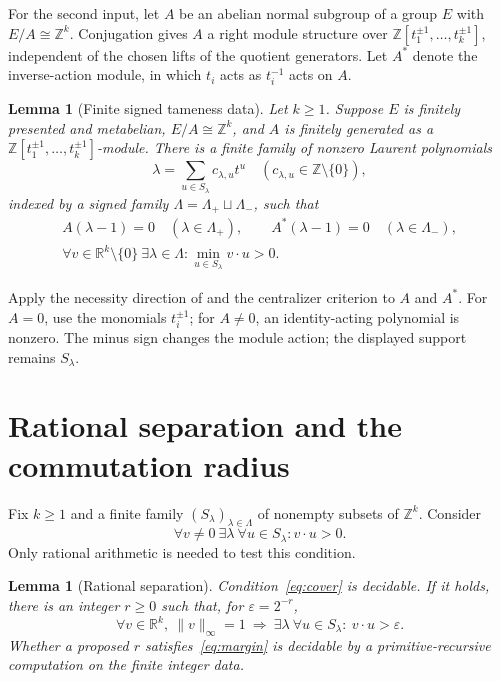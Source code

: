 \documentclass[12pt]{article}
\numberwithin{equation}{section}
\newtheorem{lemma}[theorem]{Lemma}
\theoremstyle{definition}
\theoremstyle{remark}
\newcommand{\Z}{\mathbb Z}
\newcommand{\R}{\mathbb R}
\newcommand{\norm}[1]{\lVert #1\rVert}
\newcommand{\laur}{\Z[t_1^{\pm1},\ldots,t_k^{\pm1}]}
\begin{document}
For the second input, let $A$ be an abelian normal subgroup of a group
$E$ with $E/A\cong\Z^k$. Conjugation gives $A$ a right module structure
over $\laur$, independent of the chosen lifts of the quotient generators.
Let $A^*$ denote the inverse-action module, in which $t_i$ acts as
$t_i^{-1}$ acts on $A$.

\begin{lemma}[Finite signed tameness data]
\label{lem:tameness}
Let $k\ge1$. Suppose $E$ is finitely presented and metabelian, $E/A\cong\Z^k$, and
$A$ is finitely generated as a $\laur$-module. There is a finite family
of nonzero Laurent polynomials
\[
 \lambda=\sum_{u\in S_\lambda} c_{\lambda,u}t^u
 \quad(c_{\lambda,u}\in\Z\setminus\{0\}),
\]
indexed by a signed family $\Lambda=\Lambda_+\sqcup\Lambda_-$, such that
\begin{gather*}
 A(\lambda-1)=0\quad(\lambda\in\Lambda_+),\qquad
 A^*(\lambda-1)=0\quad(\lambda\in\Lambda_-),\\[3pt]
 \forall v\in\R^k\setminus\{0\}\ \exists\lambda\in\Lambda:
       \min_{u\in S_\lambda}v\cdot u>0.
\end{gather*}
\end{lemma}

Apply the necessity direction of \cite[Theorem~A]{BS} and the
centralizer criterion \cite[Lemma~2.6]{BS} to $A$ and $A^*$.
For $A=0$, use the monomials $t_i^{\pm1}$; for $A\ne0$, an
identity-acting polynomial is nonzero. The minus sign changes the
module action; the displayed support remains $S_\lambda$.

\section{Rational separation and the commutation radius}
\label{sec:geometry}

Fix $k\ge1$ and a finite family $(S_\lambda)_{\lambda\in\Lambda}$
of nonempty subsets of $\Z^k$. Consider
\begin{equation}
\label{eq:cover}
 \forall v\ne0\ \exists\lambda\ \forall u\in S_\lambda:
       v\cdot u>0.
\end{equation}
Only rational arithmetic is needed to test this condition.

\begin{lemma}[Rational separation]
\label{lem:margin}
Condition~\eqref{eq:cover} is decidable. If it holds, there is an
integer $r\ge0$ such that, for $\varepsilon=2^{-r}$,
\begin{equation}
\label{eq:margin}
 \forall v\in\R^k,\ \norm v_\infty=1
 \ \Longrightarrow\
 \exists\lambda\ \forall u\in S_\lambda:\ v\cdot u>\varepsilon.
\end{equation}
Whether a proposed $r$ satisfies~\eqref{eq:margin} is decidable by a
primitive-recursive computation on the finite integer data.
\end{lemma}
\end{document}
